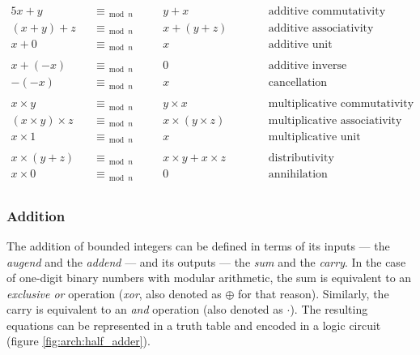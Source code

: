 \begin{alignat*}{5}
    x + y \quad &\equiv_{\bmod n} &\quad& y + x
    && \qquad \text{additive commutativity}
    \\
    (x + y) + z \quad &\equiv_{\bmod n} &\quad& x + (y + z)
    && \qquad \text{additive associativity}
    \\
    x + 0 \quad &\equiv_{\bmod n} &\quad& x
    && \qquad \text{additive unit}
    \\\\
    x + (-x) \quad &\equiv_{\bmod n} &\quad& 0
    && \qquad \text{additive inverse}
    \\
    -(-x) \quad &\equiv_{\bmod n} &\quad& x
    && \qquad \text{cancellation}
    \\\\
    x \times y \quad &\equiv_{\bmod n} &\quad& y \times x
    && \qquad \text{multiplicative commutativity}
    \\
    (x \times y) \times z \quad &\equiv_{\bmod n} &\quad& x \times (y \times z)
    && \qquad \text{multiplicative associativity}
    \\
    x \times 1 \quad &\equiv_{\bmod n} &\quad& x
    && \qquad \text{multiplicative unit}
    \\\\
    x \times (y + z) \quad &\equiv_{\bmod n} &\quad& x \times y + x \times z
    && \qquad \text{distributivity}
    \\
    x \times 0 \quad &\equiv_{\bmod n} &\quad& 0
    && \qquad \text{annihilation}
    \\
\end{alignat*}

\subsubsection{Addition}

The addition of bounded integers can be defined in terms of its inputs --- the
\textit{augend} and the \textit{addend} --- and its outputs --- the \textit{sum}
and the \textit{carry}.  In the case of one-digit binary numbers with modular
arithmetic, the sum is equivalent to an \textit{exclusive or} operation
(\textit{xor}, also denoted as $\oplus$ for that reason).  Similarly, the carry
is equivalent to an \textit{and} operation (also denoted as $\cdot$).  The
resulting equations can be represented in a truth table and encoded in a logic
circuit (figure \ref{fig:arch:half_adder}).

